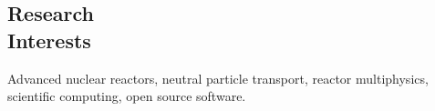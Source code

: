 \documentclass[margin,line]{admin/resume}
\begin{document}
\begin{resume}

  


  \section{\mysidestyle Research\\Interests}
  Advanced nuclear reactors, neutral particle transport, reactor multiphysics, scientific computing, open source software.
  

  


  



\end{resume}
\end{document}
